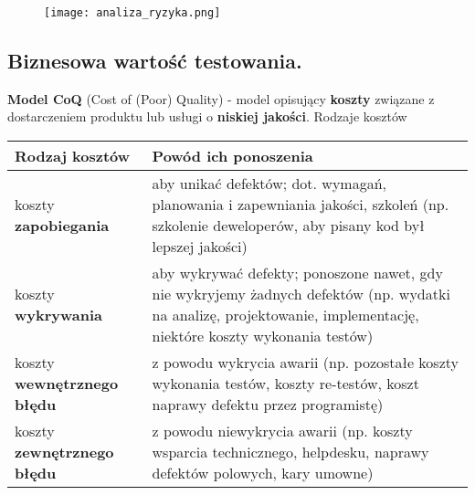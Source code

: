 \documentclass[../main.tex]{subfiles}
\begin{document}
    \begin{figure}[H]
        \texttt{[image: analiza\_ryzyka.png]}
    \end{figure}



    \subsection{Biznesowa wartość testowania.}

    \textbf{Model CoQ} (Cost of (Poor) Quality) - model opisujący \textbf{koszty} związane z dostarczeniem
    produktu lub usługi o \textbf{niskiej jakości}.
    Rodzaje kosztów

    \begin{table}[H]
        \begin{center}
            \begin{tabular}{| p{5cm} || p{11cm} |}
                \hline
                \textbf{Rodzaj kosztów} & \textbf{Powód ich ponoszenia}\\
                \hline
                \hline
                koszty \textbf{zapobiegania} & aby unikać defektów; dot. wymagań, planowania i zapewniania jakości, szkoleń (np. szkolenie deweloperów, aby pisany kod był lepszej jakości)\\
                \hline
                koszty \textbf{wykrywania} & aby wykrywać defekty; ponoszone nawet, gdy nie wykryjemy żadnych defektów (np. wydatki na analizę, projektowanie, implementację, niektóre koszty wykonania testów)\\
                \hline
                koszty \textbf{wewnętrznego błędu} & z powodu wykrycia awarii (np. pozostałe koszty wykonania testów, koszty re-testów, koszt naprawy defektu przez programistę)\\
                \hline
                koszty \textbf{zewnętrznego błędu} & z powodu niewykrycia awarii (np. koszty wsparcia technicznego, helpdesku, naprawy defektów polowych, kary umowne)\\
                \hline
            \end{tabular}
        \end{center}
    \end{table}
\end{document}
